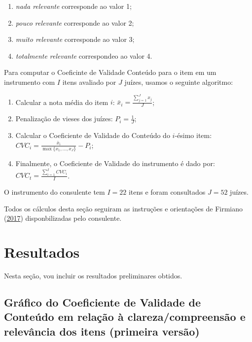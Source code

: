 \documentclass[
]{article}
\providecommand{\tightlist}{%
  \setlength{\itemsep}{0pt}\setlength{\parskip}{0pt}}
\begin{document}
\begin{enumerate}
\def\labelenumi{\arabic{enumi}.}
\tightlist
\item
  \emph{nada relevante} corresponde ao valor 1;
\item
  \emph{pouco relevante} corresponde ao valor 2;
\item
  \emph{muito relevante} corresponde ao valor 3;
\item
  \emph{totalmente relevante} correspondeo ao valor 4.
\end{enumerate}

Para computar o Coeficinte de Validade Conteúdo para o item em um instrumento com \(I\) itens avaliado por \(J\) juízes, usamos o seguinte algoritmo:

\begin{enumerate}
\def\labelenumi{\arabic{enumi}.}
\tightlist
\item
  Calcular a nota média do item \(i\): \(\bar{x}_i = \frac{\sum_{j=1}^{J}x_j}{J}\);
\item
  Penalização de vieses dos juízes: \(P_i = \frac{1}{J}\);
\item
  Calcular o Coeficiente de Validade do Conteúdo do \(i\)-ésimo item: \(CVC_i = \frac{\bar{x}_i}{\max{\{x_1, \dots, x_J\}}} - P_i\);
\item
  Finalmente, o Coeficiente de Validade do instrumento é dado por: \(CVC_t = \frac{\sum_{i=1}^{I}CVC_i}{I}\).
\end{enumerate}

O instrumento do consulente tem \(I = 22\) itens e foram consultados \(J = 52\) juízes.

Todos os cálculos desta seção seguiram as instruções e orientações de Firmiano (\protect\hyperlink{ref-firmiano2017escala}{2017}) disponbilizadas pelo consulente.

\newpage

\hypertarget{resultados}{%
\section{Resultados}\label{resultados}}

Nesta seção, vou incluir os resultados preliminares obtidos.

\hypertarget{gruxe1fico-do-coeficiente-de-validade-de-conteuxfado-em-relauxe7uxe3o-uxe0-clarezacompreensuxe3o-e-relevuxe2ncia-dos-itens-primeira-versuxe3o}{%
\subsection{Gráfico do Coeficiente de Validade de Conteúdo em relação à clareza/compreensão e relevância dos itens (primeira versão)}\label{gruxe1fico-do-coeficiente-de-validade-de-conteuxfado-em-relauxe7uxe3o-uxe0-clarezacompreensuxe3o-e-relevuxe2ncia-dos-itens-primeira-versuxe3o}}
\end{document}
